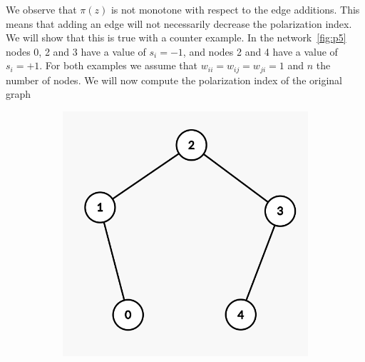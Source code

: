 We observe that $\pi(z)$ is not monotone with respect to the edge additions. This means that adding an edge will not necessarily decrease the polarization index. We will  show that this is true with a counter example. In the network~\ref{fig:p5} nodes 0, 2 and 3 have a value of $s_i=-1$, and nodes 2 and 4 have a value of $s_i=+1$. For both examples we assume that $w_{ii}=w_{ij}=w_{ji}=1$ and $n$ the number of nodes.
We will now compute the polarization index of the original graph

\begin{figure}[t]
	\centering
	\begin{subfigure}[t]{0.3\textwidth}
		\centering
		\includegraphics[height=0.15\textheight]{Figures/p5A}
		\caption{}
		\label{subfig:monotonicityA}
	\end{subfigure}
	\hfill
	\begin{subfigure}[t]{0.3\textwidth}
		\centering

\end{subfigure}
\end{figure}
